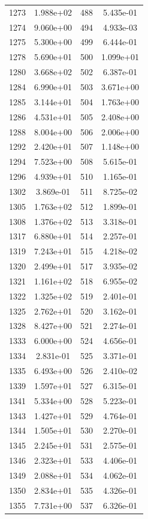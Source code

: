 \documentclass[12pt]{article}
\begin{document}
\begin{longtable}{@{}cccc@{}}
1273 & 1.988e+02 & 488 & 5.435e-01 \\
1274 & 9.060e+00 & 494 & 4.933e-03 \\
1275 & 5.300e+00 & 499 & 6.444e-01 \\
1278 & 5.690e+01 & 500 & 1.099e+01 \\
1280 & 3.668e+02 & 502 & 6.387e-01 \\
1284 & 6.990e+01 & 503 & 3.671e+00 \\
1285 & 3.144e+01 & 504 & 1.763e+00 \\
1286 & 4.531e+01 & 505 & 2.408e+00 \\
1288 & 8.004e+00 & 506 & 2.006e+00 \\
1292 & 2.420e+01 & 507 & 1.148e+00 \\
1294 & 7.523e+00 & 508 & 5.615e-01 \\
1296 & 4.939e+01 & 510 & 1.165e-01 \\
1302 & 3.869e-01 & 511 & 8.725e-02 \\
1305 & 1.763e+02 & 512 & 1.899e-01 \\
1308 & 1.376e+02 & 513 & 3.318e-01 \\
1317 & 6.880e+01 & 514 & 2.257e-01 \\
1319 & 7.243e+01 & 515 & 4.218e-02 \\
1320 & 2.499e+01 & 517 & 3.935e-02 \\
1321 & 1.161e+02 & 518 & 6.955e-02 \\
1322 & 1.325e+02 & 519 & 2.401e-01 \\
1325 & 2.762e+01 & 520 & 3.162e-01 \\
1328 & 8.427e+00 & 521 & 2.274e-01 \\
1333 & 6.000e+00 & 524 & 4.656e-01 \\
1334 & 2.831e-01 & 525 & 3.371e-01 \\
1335 & 6.493e+00 & 526 & 2.410e-02 \\
1339 & 1.597e+01 & 527 & 6.315e-01 \\
1341 & 5.334e+00 & 528 & 5.223e-01 \\
1343 & 1.427e+01 & 529 & 4.764e-01 \\
1344 & 1.505e+01 & 530 & 2.270e-01 \\
1345 & 2.245e+01 & 531 & 2.575e-01 \\
1346 & 2.323e+01 & 533 & 4.406e-01 \\
1349 & 2.088e+01 & 534 & 4.062e-01 \\
1350 & 2.834e+01 & 535 & 4.326e-01 \\
1355 & 7.731e+00 & 537 & 6.326e-01 \\

\end{longtable}
\end{document}
